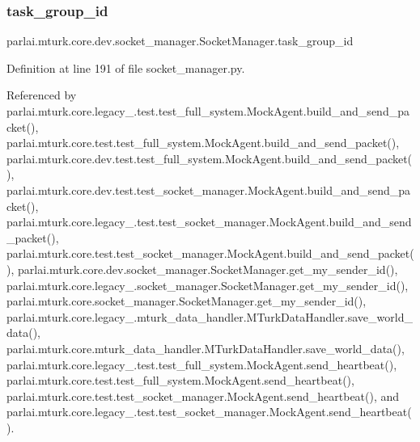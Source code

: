 \subsubsection{\texorpdfstring{task\+\_\+group\+\_\+id}{task\_group\_id}}
{\footnotesize\ttfamily parlai.\+mturk.\+core.\+dev.\+socket\+\_\+manager.\+Socket\+Manager.\+task\+\_\+group\+\_\+id}



Definition at line 191 of file socket\+\_\+manager.\+py.



Referenced by parlai.\+mturk.\+core.\+legacy\+\_.\+test.\+test\+\_\+full\+\_\+system.\+Mock\+Agent.\+build\+\_\+and\+\_\+send\+\_\+packet(), parlai.\+mturk.\+core.\+test.\+test\+\_\+full\+\_\+system.\+Mock\+Agent.\+build\+\_\+and\+\_\+send\+\_\+packet(), parlai.\+mturk.\+core.\+dev.\+test.\+test\+\_\+full\+\_\+system.\+Mock\+Agent.\+build\+\_\+and\+\_\+send\+\_\+packet(), parlai.\+mturk.\+core.\+dev.\+test.\+test\+\_\+socket\+\_\+manager.\+Mock\+Agent.\+build\+\_\+and\+\_\+send\+\_\+packet(), parlai.\+mturk.\+core.\+legacy\+\_.\+test.\+test\+\_\+socket\+\_\+manager.\+Mock\+Agent.\+build\+\_\+and\+\_\+send\+\_\+packet(), parlai.\+mturk.\+core.\+test.\+test\+\_\+socket\+\_\+manager.\+Mock\+Agent.\+build\+\_\+and\+\_\+send\+\_\+packet(), parlai.\+mturk.\+core.\+dev.\+socket\+\_\+manager.\+Socket\+Manager.\+get\+\_\+my\+\_\+sender\+\_\+id(), parlai.\+mturk.\+core.\+legacy\+\_.\+socket\+\_\+manager.\+Socket\+Manager.\+get\+\_\+my\+\_\+sender\+\_\+id(), parlai.\+mturk.\+core.\+socket\+\_\+manager.\+Socket\+Manager.\+get\+\_\+my\+\_\+sender\+\_\+id(), parlai.\+mturk.\+core.\+legacy\+\_.\+mturk\+\_\+data\+\_\+handler.\+M\+Turk\+Data\+Handler.\+save\+\_\+world\+\_\+data(), parlai.\+mturk.\+core.\+mturk\+\_\+data\+\_\+handler.\+M\+Turk\+Data\+Handler.\+save\+\_\+world\+\_\+data(), parlai.\+mturk.\+core.\+legacy\+\_.\+test.\+test\+\_\+full\+\_\+system.\+Mock\+Agent.\+send\+\_\+heartbeat(), parlai.\+mturk.\+core.\+test.\+test\+\_\+full\+\_\+system.\+Mock\+Agent.\+send\+\_\+heartbeat(), parlai.\+mturk.\+core.\+test.\+test\+\_\+socket\+\_\+manager.\+Mock\+Agent.\+send\+\_\+heartbeat(), and parlai.\+mturk.\+core.\+legacy\+\_.\+test.\+test\+\_\+socket\+\_\+manager.\+Mock\+Agent.\+send\+\_\+heartbeat().

\mbox{\label{classparlai_1_1mturk_1_1core_1_1dev_1_1socket__manager_1_1SocketManager_a8be72239621a74314dad4e859291ae89}} 
